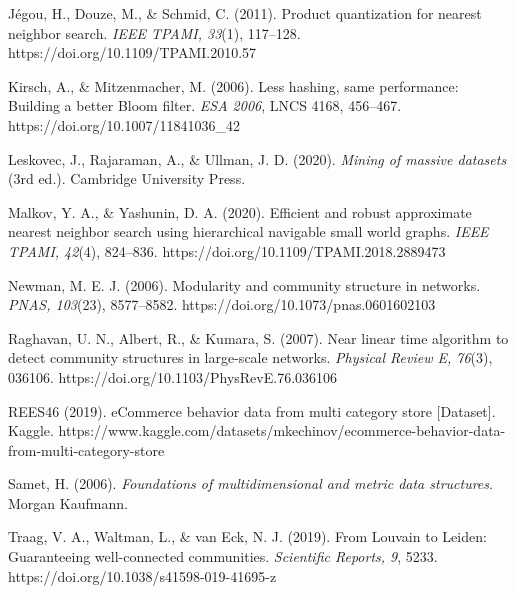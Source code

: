 Jégou, H., Douze, M., \& Schmid, C. (2011). Product quantization for nearest neighbor search. \emph{IEEE TPAMI, 33}(1), 117–128. https://doi.org/10.1109/TPAMI.2010.57

Kirsch, A., \& Mitzenmacher, M. (2006). Less hashing, same performance: Building a better Bloom filter. \emph{ESA 2006}, LNCS 4168, 456–467. https://doi.org/10.1007/11841036\_42

Leskovec, J., Rajaraman, A., \& Ullman, J. D. (2020). \emph{Mining of massive datasets} (3rd ed.). Cambridge University Press.

Malkov, Y. A., \& Yashunin, D. A. (2020). Efficient and robust approximate nearest neighbor search using hierarchical navigable small world graphs. \emph{IEEE TPAMI, 42}(4), 824–836. https://doi.org/10.1109/TPAMI.2018.2889473

Newman, M. E. J. (2006). Modularity and community structure in networks. \emph{PNAS, 103}(23), 8577–8582. https://doi.org/10.1073/pnas.0601602103

Raghavan, U. N., Albert, R., \& Kumara, S. (2007). Near linear time algorithm to detect community structures in large-scale networks. \emph{Physical Review E, 76}(3), 036106. https://doi.org/10.1103/PhysRevE.76.036106

REES46 (2019). eCommerce behavior data from multi category store [Dataset]. Kaggle. https://www.kaggle.com/datasets/mkechinov/ecommerce-behavior-data-from-multi-category-store

Samet, H. (2006). \emph{Foundations of multidimensional and metric data structures}. Morgan Kaufmann.

Traag, V. A., Waltman, L., \& van Eck, N. J. (2019). From Louvain to Leiden: Guaranteeing well-connected communities. \emph{Scientific Reports, 9}, 5233. https://doi.org/10.1038/s41598-019-41695-z

